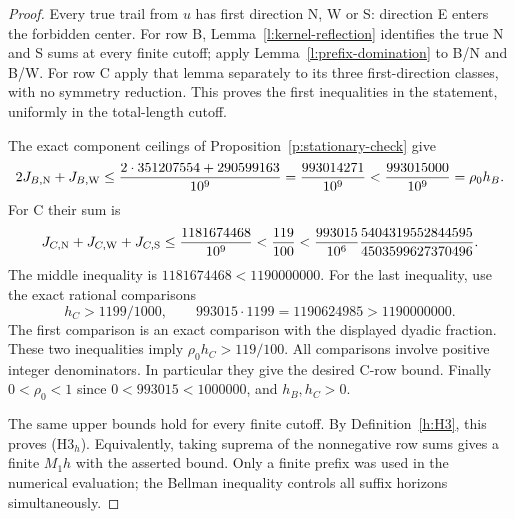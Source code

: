 \begin{proof}
Every true trail from \(u\) has first direction N, W or S: direction
E enters the forbidden center. For row B,
Lemma~\ref{l:kernel-reflection} identifies the true N and S sums
at every finite cutoff; apply Lemma~\ref{l:prefix-domination}
to B/N and B/W. For row C apply that lemma separately to its
three first-direction classes, with no symmetry reduction.
This proves the first inequalities in the statement, uniformly in
the total-length cutoff.

The exact component ceilings of Proposition~\ref{p:stationary-check}
give
\[
 2J_{B,{\rm N}}+J_{B,{\rm W}}
 \le\frac{2\cdot351207554+290599163}{10^9}
 =\frac{993014271}{10^9}
 <\frac{993015000}{10^9}=\rho_0h_B.
\]
For C their sum is
\[
 J_{C,{\rm N}}+J_{C,{\rm W}}+J_{C,{\rm S}}
 \le\frac{1181674468}{10^9}
 <\frac{119}{100}
 <\frac{993015}{10^6}
             \frac{5404319552844595}{4503599627370496}.
\]
The middle inequality is \(1181674468<1190000000\).
For the last inequality, use the exact rational comparisons
\[
 h_C>1199/1000,\qquad
 993015\cdot1199=1190624985>1190000000.
\]
The first comparison is an exact comparison with the displayed
dyadic fraction. These two inequalities imply
\(\rho_0h_C>119/100\). All comparisons involve positive integer
denominators. In particular they give the desired C-row bound.
Finally \(0<\rho_0<1\) since \(0<993015<1000000\), and
\(h_B,h_C>0\).

The same upper bounds hold for every finite cutoff. By
Definition~\ref{h:H3}, this proves (H3\(_h\)). Equivalently, taking
suprema of the nonnegative row sums gives a finite \(M_1h\)
with the asserted bound. Only a finite prefix was used in the
numerical evaluation; the Bellman inequality controls all suffix
horizons simultaneously.
\end{proof}

